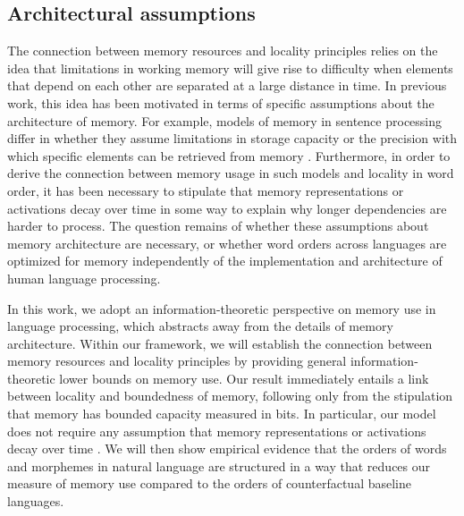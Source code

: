 \subsection{Architectural assumptions}

The connection between memory resources and locality principles relies on the idea that limitations in working memory will give rise to difficulty when elements that depend on each other are separated at a large distance in time. In previous work, this idea has been motivated in terms of specific assumptions about the architecture of memory. For example, models of memory in sentence processing differ in whether they assume limitations in storage capacity \citep[e.g., `memory cost' in the model of][]{gibson1998linguistic} or the precision with which specific elements can be retrieved from memory \citep[e.g.][]{lewis-activation-based-2005}. Furthermore, in order to derive the connection between memory usage in such models and locality in word order, it has been necessary to stipulate that memory representations or activations decay over time in some way to explain why longer dependencies are harder to process.
The question remains of whether these assumptions about memory architecture are necessary, or whether word orders across languages are optimized for memory independently of the implementation and architecture of human language processing.

In this work, we adopt an information-theoretic perspective on memory use in language processing, which abstracts away from the details of memory architecture. 
Within our framework, we will establish the connection between memory resources and locality principles by providing general information-theoretic lower bounds on memory use.
Our result immediately entails a link between locality and boundedness of memory, following only from the stipulation that memory has bounded capacity measured in bits. 
In particular, our model does not require any assumption that memory representations or activations decay over time \citep[as was required in][]{gibson1998linguistic, lewis-activation-based-2005, futrell2020lossy}.
We will then show empirical evidence that the orders of words and morphemes in natural language are structured in a way that reduces our measure of memory use compared to the orders of counterfactual baseline languages.

